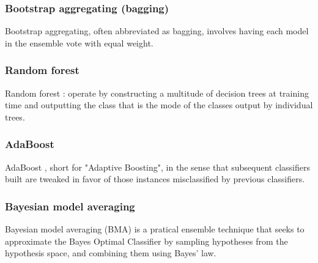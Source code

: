 \subsubsection{Bootstrap aggregating (bagging)}
\cite{breiman1996bagging} Bootstrap aggregating, often abbreviated as bagging, involves having each model in the ensemble vote with equal weight.

\subsubsection{Random forest}

Random forest \cite{breiman2001random}: operate by constructing a multitude of decision trees at training time and outputting the class that is the mode of the classes output by individual trees. 

\subsubsection{AdaBoost}



AdaBoost \cite{freund1997decision}, short for "Adaptive Boosting", in the sense that subsequent classifiers built are tweaked in favor of those instances misclassified by previous classifiers. 


\subsubsection{Bayesian model averaging}

\cite{hoeting1999bayesian} Bayesian model averaging (BMA) is a pratical ensemble technique that seeks to approximate the Bayes Optimal Classifier by sampling hypotheses from the hypothesis space, and combining them using Bayes' law.